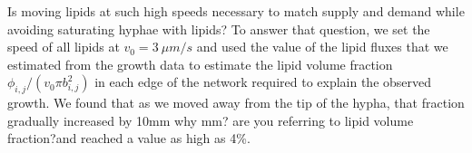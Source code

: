 Is moving lipids at such high speeds necessary to match supply and demand while avoiding saturating hyphae with lipids?
To answer that question, we set the speed of all lipids at $v_0 = 3~\mu m/s$ and used the value of the lipid fluxes that we estimated from the growth data to estimate the lipid volume fraction $\phi_{i,j}/(v_0 \pi b_{i,j}^2)$ in each edge of the network required to explain the observed growth.
We found that as we moved away from the tip of the hypha, that fraction gradually increased by 10mm {\color{blue} why mm? are you referring to lipid volume fraction?}and reached a value as high as 4\%.
